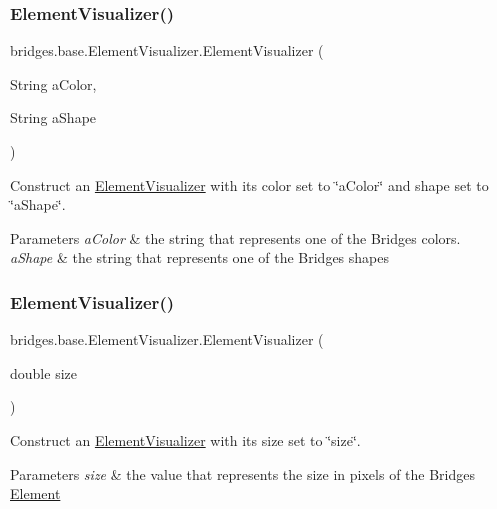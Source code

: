 \subsubsection{\texorpdfstring{ElementVisualizer()}{ElementVisualizer()}\hspace{0.1cm}{\footnotesize\ttfamily [3/6]}}
{\footnotesize\ttfamily bridges.\+base.\+Element\+Visualizer.\+Element\+Visualizer (\begin{DoxyParamCaption}\item[{String}]{a\+Color,  }\item[{String}]{a\+Shape }\end{DoxyParamCaption})}

Construct an \mbox{\hyperlink{classbridges_1_1base_1_1_element_visualizer}{Element\+Visualizer}} with its color set to \char`\"{}a\+Color\char`\"{} and shape set to \char`\"{}a\+Shape\char`\"{}.


\begin{DoxyParams}{Parameters}
{\em a\+Color} & the string that represents one of the Bridges colors. \\
\hline
{\em a\+Shape} & the string that represents one of the Bridges shapes \\
\hline
\end{DoxyParams}
\mbox{\label{classbridges_1_1base_1_1_element_visualizer_ab32f66b72ccf0a26c03ba44006da9ac6}} 
\subsubsection{\texorpdfstring{ElementVisualizer()}{ElementVisualizer()}\hspace{0.1cm}{\footnotesize\ttfamily [4/6]}}
{\footnotesize\ttfamily bridges.\+base.\+Element\+Visualizer.\+Element\+Visualizer (\begin{DoxyParamCaption}\item[{double}]{size }\end{DoxyParamCaption})}

Construct an \mbox{\hyperlink{classbridges_1_1base_1_1_element_visualizer}{Element\+Visualizer}} with its size set to \char`\"{}size\char`\"{}.


\begin{DoxyParams}{Parameters}
{\em size} & the value that represents the size in pixels of the Bridges \mbox{\hyperlink{classbridges_1_1base_1_1_element}{Element}} \\
\hline
\end{DoxyParams}
\mbox{\label{classbridges_1_1base_1_1_element_visualizer_a9bf06ca1b6c215e079ab33ccd99633e8}} 
